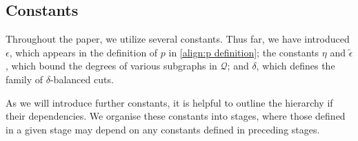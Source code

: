 \documentclass[11pt,a4paper,oneside,reqno]{amsart}
\newcommand{\cC}{\mathcal{C}}
\newcommand{\cQ}{\mathcal{Q}}
\newcommand{\1}{\mathbbm{1}} %
\renewcommand{\le}{\leqslant}
\newcommand{\cQH}{\cQ^{\mathrm{high}}}
\newcommand{\deficit}{\mathrm{def}}
\begin{document}
%    
%
%

\subsection{Constants}\label{section:constants}
Throughout the paper, we utilize several constants. Thus far, we have introduced $\epsilon$, which appears in the definition of $p$ in \eqref{align:p definition}; the constants $\eta$ and $\tilde{\epsilon}$, which bound the degrees of various subgraphs in $\cQ$; and $\delta$, which defines the family of $\delta$-balanced cuts. 

As we will introduce further constants, it is helpful to outline the hierarchy if their dependencies. We organise these constants into stages, where those defined in a given stage may depend on any constants defined in preceding stages.
\end{document}
